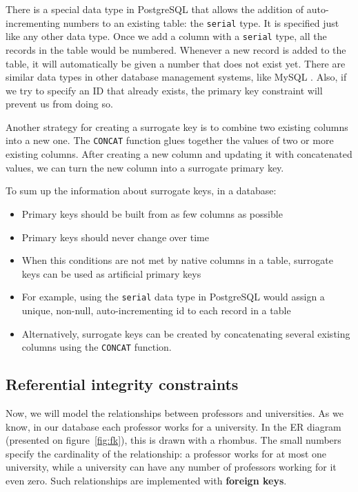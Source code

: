 \documentclass[11pt]{article}
\begin{document}
    There is a special data type in PostgreSQL that allows the addition of auto-incrementing numbers to an existing table: the \texttt{serial} type.
    It is specified just like any other data type.
    Once we add a column with a \texttt{serial} type, all the records in the table would be numbered.
    Whenever a new record is added to the table, it will automatically be given a number that does not exist yet.
    There are similar data types in other database management systems, like MySQL .
    Also, if we try to specify an ID that already exists, the primary key constraint will prevent us from doing so.

    Another strategy for creating a surrogate key is to combine two existing columns into a new one.
    The \texttt{CONCAT} function glues together the values of two or more existing columns.
    After creating a new column and updating it with concatenated values, we can turn the new column into a surrogate primary key.

    To sum up the information about surrogate keys, in a database:

    \begin{itemize}
        \item Primary keys should be built from as few columns as possible
        \item Primary keys should never change over time
        \item When this conditions are not met by native columns in a table, surrogate keys can be used as artificial primary keys
        \item For example, using the \texttt{serial} data type in PostgreSQL would assign a unique, non-null, auto-incrementing id to each record in a table
        \item Alternatively, surrogate keys can be created by concatenating several existing columns using the \texttt{CONCAT} function.
    \end{itemize}

    \subsection{Referential integrity constraints} \label{subsec:ref_integrity}

    Now, we will model the relationships between professors and universities.
    As we know, in our database each professor works for a university.
    In the ER diagram (presented on figure~\ref{fig:fk}), this is drawn with a rhombus.
    The small numbers specify the cardinality of the relationship: a professor works for at most one university, while a university can have any number of professors working for it \textemdash even zero.
    Such relationships are implemented with \textbf{foreign keys}.
\end{document}
